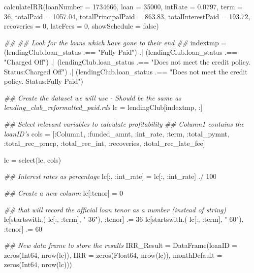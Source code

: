 \documentclass[11pt,]{report}
\newenvironment{Shaded}{\begin{snugshade}}{\end{snugshade}}
\newcommand{\CommentTok}[1]{\textcolor[rgb]{0.56,0.35,0.01}{\textit{#1}}}
\newcommand{\DataTypeTok}[1]{\textcolor[rgb]{0.13,0.29,0.53}{#1}}
\newcommand{\FloatTok}[1]{\textcolor[rgb]{0.00,0.00,0.81}{#1}}
\newcommand{\NormalTok}[1]{#1}
\newcommand{\StringTok}[1]{\textcolor[rgb]{0.31,0.60,0.02}{#1}}
\begin{document}
\begin{Shaded}
\begin{Highlighting}[numbers=left,,]
\NormalTok{calculateIRR(loanNumber = }\FloatTok{1734666}\NormalTok{, loan = }\FloatTok{35000}\NormalTok{, intRate = }\FloatTok{0.0797}\NormalTok{, term = }\FloatTok{36}\NormalTok{,}
\NormalTok{             totalPaid = }\FloatTok{1057.04}\NormalTok{, totalPrincipalPaid = }\FloatTok{863.83}\NormalTok{, totalInterestPaid = }\FloatTok{193.72}\NormalTok{,}
\NormalTok{             recoveries = }\FloatTok{0}\NormalTok{, lateFees = }\FloatTok{0}\NormalTok{,}
\NormalTok{             showSchedule = false)}




\CommentTok{##}
\CommentTok{## Look for the loans which have gone to their end}
\CommentTok{##}
\NormalTok{indextmp = (lendingClub.loan_status .== }\StringTok{"Fully Paid"}\NormalTok{) .|}
\NormalTok{           (lendingClub.loan_status .== }\StringTok{"Charged Off"}\NormalTok{) .|}
\NormalTok{           (lendingClub.loan_status .== }\StringTok{"Does not meet the credit policy. Status:Charged Off"}\NormalTok{) .|}
\NormalTok{           (lendingClub.loan_status .== }\StringTok{"Does not meet the credit policy. Status:Fully Paid"}\NormalTok{)}

\CommentTok{## Create the dataset we will use - Should be the same as lending_club_reformatted_paid.rds}
\NormalTok{lc = lendingClub[indextmp, :]}

\CommentTok{## Select relevant variables to calculate profitability}
\CommentTok{## Column1 contains the loanID's}
\NormalTok{cols = [:Column1, :funded_amnt, :int_rate, :term,}
\NormalTok{        :total_pymnt, :total_rec_prncp, :total_rec_int,}
\NormalTok{        :recoveries, :total_rec_late_fee]}

\NormalTok{lc = select(lc, cols)}

\CommentTok{## Interest rates as percentage}
\NormalTok{lc[:, :int_rate] = lc[:, :int_rate] ./ }\FloatTok{100}

\CommentTok{## Create a new column}
\NormalTok{lc[:tenor] = }\FloatTok{0}

\CommentTok{## that will record the official loan tenor as a number (instead of string)}
\NormalTok{lc[startswith.( lc[:, :term], }\StringTok{" 36"}\NormalTok{), :tenor] .= }\FloatTok{36}
\NormalTok{lc[startswith.( lc[:, :term], }\StringTok{" 60"}\NormalTok{), :tenor] .= }\FloatTok{60}

\CommentTok{## New data frame to store the results}
\NormalTok{IRR_Result = DataFrame(loanID = zeros(}\DataTypeTok{Int64}\NormalTok{, nrow(lc)),}
\NormalTok{                       IRR = zeros(}\DataTypeTok{Float64}\NormalTok{, nrow(lc)),}
\NormalTok{                       monthDefault = zeros(}\DataTypeTok{Int64}\NormalTok{, nrow(lc)))}



\end{Highlighting}
\end{Shaded}
\end{document}
